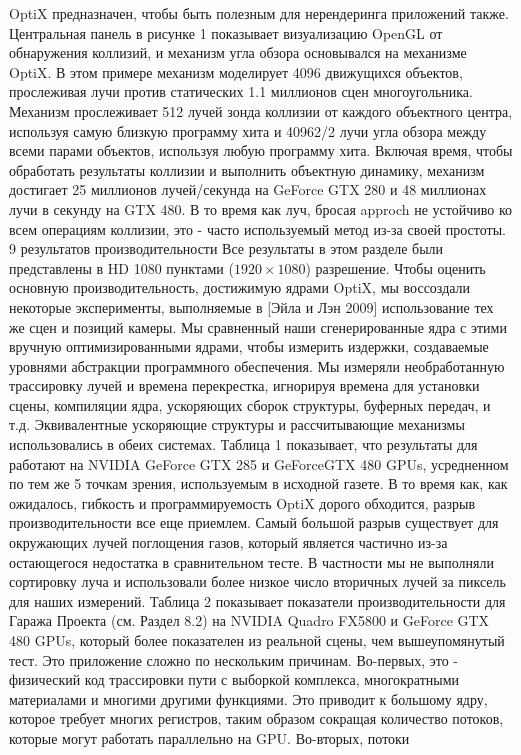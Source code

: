 OptiX предназначен, чтобы быть полезным для нерендеринга приложений также. Центральная панель в рисунке 1 показывает визуализацию OpenGL от обнаружения коллизий, и механизм угла обзора основывался на механизме OptiX. В этом примере механизм моделирует 4096 движущихся объектов, прослеживая лучи против статических 1.1 миллионов сцен многоугольника.
Механизм прослеживает 512 лучей зонда коллизии от каждого объектного центра, используя самую близкую программу хита и 40962/2 лучи угла обзора между всеми парами объектов, используя любую программу хита. Включая время, чтобы обработать результаты коллизии и выполнить объектную динамику, механизм достигает 25 миллионов лучей/секунда на GeForce GTX 280 и 48 миллионах
лучи в секунду на GTX 480. В то время как луч, бросая approch
не устойчиво ко всем операциям коллизии, это - часто используемый метод из-за своей простоты.
9 результатов производительности
Все результаты в этом разделе были представлены в HD 1080 пунктами ($1920\times1080$) разрешение. Чтобы оценить основную производительность, достижимую ядрами OptiX, мы воссоздали некоторые эксперименты, выполняемые в [Эйла и Лэн 2009] использование тех же сцен и позиций камеры. Мы
сравненный наши сгенерированные ядра с этими вручную оптимизированными ядрами, чтобы измерить издержки, создаваемые уровнями абстракции программного обеспечения. Мы измеряли необработанную трассировку лучей и времена перекрестка, игнорируя времена для установки сцены, компиляции ядра, ускоряющих сборок структуры, буферных передач, и т.д. Эквивалентные ускоряющие структуры и
рассчитывающие механизмы использовались в обеих системах. Таблица 1 показывает, что результаты для работают на NVIDIA GeForce GTX 285 и GeForceGTX 480 GPUs, усредненном по тем же 5 точкам зрения, используемым в исходной газете. В то время как, как ожидалось, гибкость и программируемость OptiX дорого обходится, разрыв производительности все еще приемлем. Самый большой разрыв существует для окружающих лучей поглощения газов, который является частично
из-за остающегося недостатка в сравнительном тесте. В частности мы не выполняли сортировку луча и использовали более низкое число вторичных лучей за пиксель для наших измерений.
Таблица 2 показывает показатели производительности для Гаража Проекта (см. Раздел 8.2) на NVIDIA Quadro FX5800 и GeForce GTX 480 GPUs, который более показателен из реальной сцены, чем вышеупомянутый тест. Это приложение сложно по нескольким причинам. Во-первых, это - физический код трассировки пути с выборкой комплекса, многократными материалами и многими другими функциями. Это приводит к большому ядру, которое требует многих регистров, таким образом сокращая количество потоков, которые могут работать параллельно на GPU. Во-вторых, потоки
